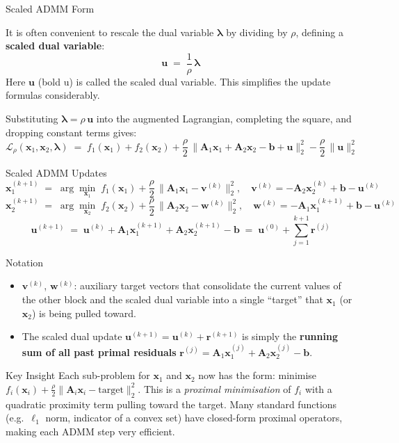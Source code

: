 \documentclass[aspectratio=169,10pt]{beamer}
\newcommand{\bx}{\mathbf{x}}
\newcommand{\bu}{\mathbf{u}}
\newcommand{\bv}{\mathbf{v}}
\newcommand{\bw}{\mathbf{w}}
\newcommand{\bA}{\mathbf{A}}
\newcommand{\bb}{\mathbf{b}}
\newcommand{\blam}{\boldsymbol{\lambda}}
\newcommand{\calL}{\mathcal{L}}
\begin{document}
\begin{frame}[allowframebreaks]{Scaled ADMM Form}

  It is often convenient to rescale the dual variable $\blam$ by dividing
  by $\rho$, defining a \textbf{scaled dual variable}:
  \[
    \bu \;=\; \frac{1}{\rho}\,\blam
  \]
  Here $\bu$ (bold u) is called the scaled dual variable.  This
  simplifies the update formulas considerably.

  \medskip
  Substituting $\blam = \rho\,\bu$ into the augmented Lagrangian,
  completing the square, and dropping constant terms gives:
  \[
    \calL_\rho(\bx_1, \bx_2, \blam)
    \;=\; f_1(\bx_1) + f_2(\bx_2)
    + \frac{\rho}{2}\,\|\bA_1\bx_1 + \bA_2\bx_2 - \bb + \bu\|_2^2
    - \frac{\rho}{2}\,\|\bu\|_2^2
  \]

  \begin{block}{Scaled ADMM Updates}
    \[
      \bx_1^{(k+1)} \;=\; \arg\min_{\bx_1}\;
        f_1(\bx_1) + \frac{\rho}{2}\,\|\bA_1\bx_1 - \bv^{(k)}\|_2^2,
      \quad \bv^{(k)} = -\bA_2\bx_2^{(k)} + \bb - \bu^{(k)}
    \]
    \[
      \bx_2^{(k+1)} \;=\; \arg\min_{\bx_2}\;
        f_2(\bx_2) + \frac{\rho}{2}\,\|\bA_2\bx_2 - \bw^{(k)}\|_2^2,
      \quad \bw^{(k)} = -\bA_1\bx_1^{(k+1)} + \bb - \bu^{(k)}
    \]
    \[
      \bu^{(k+1)} \;=\; \bu^{(k)} + \bA_1\bx_1^{(k+1)} + \bA_2\bx_2^{(k+1)} - \bb
      \;=\; \bu^{(0)} + \sum_{j=1}^{k+1} \mathbf{r}^{(j)}
    \]
  \end{block}

  \begin{block}{Notation}
    \begin{itemize}
      \item $\bv^{(k)}$, $\bw^{(k)}$: auxiliary target vectors that
            consolidate the current values of the other block and the
            scaled dual variable into a single ``target'' that $\bx_1$
            (or $\bx_2$) is being pulled toward.
      \item The scaled dual update $\bu^{(k+1)} = \bu^{(k)} + \mathbf{r}^{(k+1)}$
            is simply the \textbf{running sum of all past primal residuals}
            $\mathbf{r}^{(j)} = \bA_1\bx_1^{(j)} + \bA_2\bx_2^{(j)} - \bb$.
    \end{itemize}
  \end{block}

  \begin{alertblock}{Key Insight}
    Each sub-problem for $\bx_1$ and $\bx_2$ now has the form:
    minimise $f_i(\bx_i) + \frac{\rho}{2}\|\bA_i\bx_i - \text{target}\|_2^2$.
    This is a \emph{proximal minimisation} of $f_i$ with a quadratic
    proximity term pulling toward the target.  Many standard functions
    (e.g.\ $\ell_1$ norm, indicator of a convex set) have closed-form
    proximal operators, making each ADMM step very efficient.
  \end{alertblock}

\end{frame}
\end{document}
